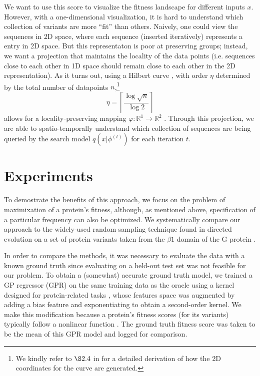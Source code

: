 \documentclass{article}
\begin{document}
We want to use this score to visualize the fitness landscape for different
inputs $x$. However, with a one-dimensional visualization, it is hard to
understand which collection of variants are more ``fit'' than others. Naively,
one could view the sequences in 2D space, where each sequence (inserted
iteratively) represents a entry in 2D space. But this representaton is poor at
preserving groups; instead, we want a projection that maintains the locality of
the data points (i.e. sequences close to each other in 1D space should remain
close to each other in the 2D representation). As it turns out, using a Hilbert
curve \cite{hilbert1935stetige}, with order $\eta$ determined by the total
number of datapoints $n$,\footnote{We kindly refer to $\S 2.4$ in
\cite{sagan2012space} for a detailed derivation of how the 2D coordinates for
the curve are generated.}
%
\begin{equation}
  \eta = \left\lceil \frac{\log \sqrt{n}}{\log 2} \right\rceil
  \label{eq:hilbert_order}
\end{equation}
%
allows for a locality-preserving mapping $\varphi: \mathbb{R}^1 \to
\mathbb{R}^2$ \cite{moon2001analysis}. Through this projection, we are able to
spatio-temporally understand which collection of sequences are being queried by
the search model $q(x|\phi^{(t)})$ for each iteration $t$.


\section{Experiments}
\label{sec:experiments}
To demostrate the benefits of this approach, we focus on the problem of
maximixation of a protein's fitness, although, as mentioned above, specification
of a particular frequency can also be optimized. We systematically compare our
approach to the widely-used random sampling technique found in directed
evolution on a set of protein variants taken from the $\beta 1$ domain of the G
protein \cite{wu2016adaptation}.

In order to compare the methods, it was necessary to evaluate the data with a
known ground truth since evaluating on a held-out test set was not feasible for
our problem. To obtain a (somewhat) accurate ground truth model, we trained a GP
regressor (GPR) on the same training data as the oracle using a kernel designed
for protein-related tasks \cite{shen2014introduction}, whose features space was
augmented by adding a bias feature and exponentiating to obtain a second-order
kernel. We make this modification because a protein's fitness scores (for its
variants) typically follow a nonlinear function \cite{hu2004developing}. The
ground truth fitness score was taken to be the mean of this GPR model and logged
for comparison. 
\end{document}
